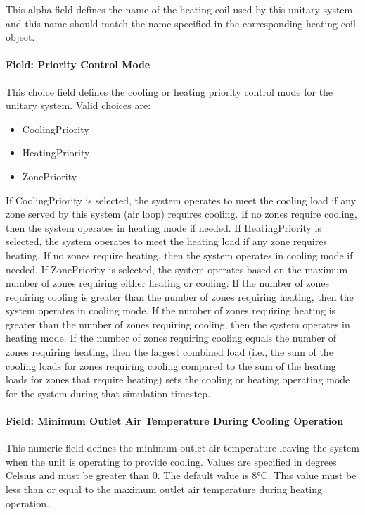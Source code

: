 This alpha field defines the name of the heating coil used by this unitary system, and this name should match the name specified in the corresponding heating coil object.

\paragraph{Field: Priority Control Mode}\label{field-priority-control-mode}

This choice field defines the cooling or heating priority control mode for the unitary system. Valid choices are:

\begin{itemize}
\item
  CoolingPriority
\item
  HeatingPriority
\item
  ZonePriority
\end{itemize}

If CoolingPriority is selected, the system operates to meet the cooling load if any zone served by this system (air loop) requires cooling. If no zones require cooling, then the system operates in heating mode if needed. If HeatingPriority is selected, the system operates to meet the heating load if any zone requires heating. If no zones require heating, then the system operates in cooling mode if needed. If ZonePriority is selected, the system operates based on the maximum number of zones requiring either heating or cooling. If the number of zones requiring cooling is greater than the number of zones requiring heating, then the system operates in cooling mode. If the number of zones requiring heating is greater than the number of zones requiring cooling, then the system operates in heating mode. If the number of zones requiring cooling equals the number of zones requiring heating, then the largest combined load (i.e., the sum of the cooling loads for zones requiring cooling compared to the sum of the heating loads for zones that require heating) sets the cooling or heating operating mode for the system during that simulation timestep.

\paragraph{Field: Minimum Outlet Air Temperature During Cooling Operation}\label{field-minimum-outlet-air-temperature-during-cooling-operation}

This numeric field defines the minimum outlet air temperature leaving the system when the unit is operating to provide cooling. Values are specified in degrees Celsius and must be greater than 0. The default value is 8°C. This value must be less than or equal to the maximum outlet air temperature during heating operation.

